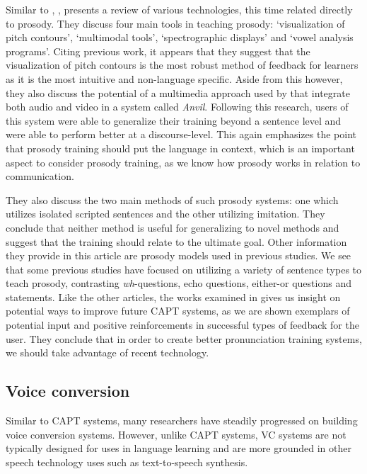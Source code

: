\documentclass
[
    a4paper,
    twoside,
    12pt
]
{report}
\begin{document}
Similar to \textcite{eskenazi2009}, \textcite{chun2008}, presents a
review of various technologies, this time related directly to prosody.
They discuss four main tools in teaching prosody: `visualization of
pitch contours', `multimodal tools', `spectrographic displays' and
`vowel analysis programs'. Citing previous work, it appears that they
suggest that the visualization of pitch contours is the most robust
method of feedback for learners as it is the most intuitive and
non-language specific. Aside from this however, they also discuss the
potential of a multimedia approach used by \textcite{hardison2005} that
integrate both audio and video in a system called \textit{Anvil}.
Following this research, users of this system were able to generalize
their training beyond a sentence level and were able to perform better
at a discourse-level. This again emphasizes the point that prosody
training should put the language in context, which is an important
aspect to consider prosody training, as we know how prosody works in
relation to communication.

They also discuss the two main methods of such prosody systems: one
which utilizes isolated scripted sentences and the other utilizing
imitation. They conclude that neither method is useful for generalizing
to novel methods and suggest that the training should relate to the
ultimate goal. Other information they provide in this article are
prosody models used in previous studies. We see that some previous
studies have focused on utilizing a variety of sentence types to teach
prosody, contrasting \textit{wh}-questions, echo questions, either-or
questions and statements. Like the other articles, the works examined in
\textcite{chun2008} gives us insight on potential ways to improve future
CAPT systems, as we are shown exemplars of potential input and positive
reinforcements in successful types of feedback for the user. They
conclude that in order to create better pronunciation training systems,
we should take advantage of recent technology.

\subsection{Voice conversion}\label{voice-conversion}

Similar to CAPT systems, many researchers have steadily progressed on
building voice conversion systems. However, unlike CAPT systems, VC
systems are not typically designed for uses in language learning and are
more grounded in other speech technology uses such as text-to-speech
synthesis.
\end{document}
